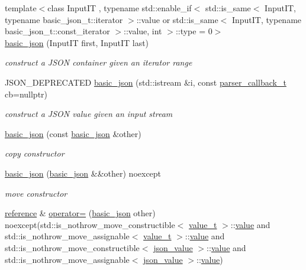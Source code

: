 \begin{DoxyCompactItemize}
{\footnotesize template$<$class Input\+IT , typename std\+::enable\+\_\+if$<$ std\+::is\+\_\+same$<$ Input\+I\+T, typename basic\+\_\+json\+\_\+t\+::iterator $>$\+::value or std\+::is\+\_\+same$<$ Input\+I\+T, typename basic\+\_\+json\+\_\+t\+::const\+\_\+iterator $>$\+::value, int $>$\+::type  = 0$>$ }\\\hyperlink{classnlohmann_1_1basic__json_af7acf3838a79363356f24538941a559c}{basic\+\_\+json} (Input\+IT first, Input\+IT last)
\begin{DoxyCompactList}\small\item\em construct a J\+S\+ON container given an iterator range \end{DoxyCompactList}\item 
J\+S\+O\+N\+\_\+\+D\+E\+P\+R\+E\+C\+A\+T\+ED \hyperlink{classnlohmann_1_1basic__json_a32350263eb105764844c5a85e156a255}{basic\+\_\+json} (std\+::istream \&i, const \hyperlink{classnlohmann_1_1basic__json_a9e35475e2027520a78e09f460dbe048a}{parser\+\_\+callback\+\_\+t} cb=nullptr)
\begin{DoxyCompactList}\small\item\em construct a J\+S\+ON value given an input stream \end{DoxyCompactList}\item 
\hyperlink{classnlohmann_1_1basic__json_a4ab93491f82545342562c7ee7e3166c7}{basic\+\_\+json} (const \hyperlink{classnlohmann_1_1basic__json}{basic\+\_\+json} \&other)
\begin{DoxyCompactList}\small\item\em copy constructor \end{DoxyCompactList}\item 
\hyperlink{classnlohmann_1_1basic__json_a73e150cbcba5643cb89de8f515eb64e2}{basic\+\_\+json} (\hyperlink{classnlohmann_1_1basic__json}{basic\+\_\+json} \&\&other) noexcept
\begin{DoxyCompactList}\small\item\em move constructor \end{DoxyCompactList}\item 
\hyperlink{classnlohmann_1_1basic__json_a3ec8e17be8732fe436e9d6733f52b7a3}{reference} \& \hyperlink{classnlohmann_1_1basic__json_ae08fa64b9f0a5b5c878cbbabb7a296ee}{operator=} (\hyperlink{classnlohmann_1_1basic__json}{basic\+\_\+json} other) noexcept(std\+::is\+\_\+nothrow\+\_\+move\+\_\+constructible$<$ \hyperlink{classnlohmann_1_1basic__json_a231b02148577b69a154b2ce2c87a5522}{value\+\_\+t} $>$\+::\hyperlink{classnlohmann_1_1basic__json_a407e73a037e6e3067ef7aa2c25a79f39}{value} and std\+::is\+\_\+nothrow\+\_\+move\+\_\+assignable$<$ \hyperlink{classnlohmann_1_1basic__json_a231b02148577b69a154b2ce2c87a5522}{value\+\_\+t} $>$\+::\hyperlink{classnlohmann_1_1basic__json_a407e73a037e6e3067ef7aa2c25a79f39}{value} and std\+::is\+\_\+nothrow\+\_\+move\+\_\+constructible$<$ \hyperlink{unionnlohmann_1_1basic__json_1_1json__value}{json\+\_\+value} $>$\+::\hyperlink{classnlohmann_1_1basic__json_a407e73a037e6e3067ef7aa2c25a79f39}{value} and std\+::is\+\_\+nothrow\+\_\+move\+\_\+assignable$<$ \hyperlink{unionnlohmann_1_1basic__json_1_1json__value}{json\+\_\+value} $>$\+::\hyperlink{classnlohmann_1_1basic__json_a407e73a037e6e3067ef7aa2c25a79f39}{value})

\end{DoxyCompactItemize}
